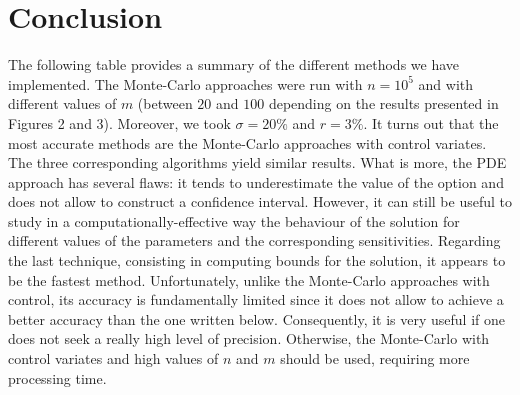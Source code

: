 \documentclass{article}
\begin{document}
\section*{Conclusion}

The following table provides a summary of the different methods we have implemented.
The Monte-Carlo approaches were run with $n=10^5$ and
with different values of $m$ (between $20$ and $100$ depending on the results
presented in Figures 2 and 3). Moreover, we took $\sigma=20\%$ and $r=3\%$. It turns out that
the most accurate methods are the Monte-Carlo approaches with control variates. The three corresponding
algorithms yield similar results. What is more, the PDE approach has several flaws: it tends to underestimate
the value of the
option and does not allow to construct a confidence interval. However, it can still be useful to study in a
computationally-effective way the behaviour of the solution for different values of the parameters and the corresponding
sensitivities. Regarding the last technique, consisting in computing bounds for the solution, it appears to be
the fastest method. Unfortunately, unlike the Monte-Carlo approaches with control, its accuracy is fundamentally limited
since it does not allow to achieve a better accuracy than the one written below. Consequently, it is very useful if
one does not seek a really high level of precision. Otherwise, the Monte-Carlo with control variates and high values
of $n$ and $m$ should be used, requiring more processing time.

\renewcommand{\arraystretch}{1.2}
\end{document}
